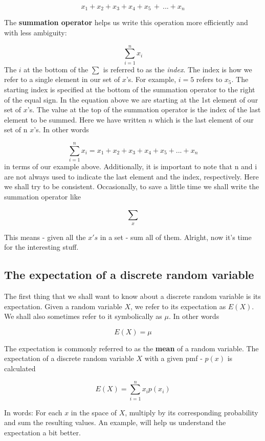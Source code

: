\documentclass[
]{book}
\theoremstyle{definition}
\theoremstyle{definition}
\theoremstyle{definition}
\theoremstyle{definition}
\theoremstyle{remark}
\begin{document}
\[
x_1 + x_2 + x_3 + x_4 + x_5 \,+\:... + x_n
\]

The \textbf{summation operator} helps us write this operation more efficiently and with less ambiguity:

\[
\sum_{i=1}^{n} x_i
\label{eq:summation}
\]
The \(i\) at the bottom of the \(\sum{}^{}\) is referred to as the \emph{index}. The index is how we refer to a single element in our set of \(x\)'s. For example, \(i=5\) refers to \(x_5\). The starting index is specified at the bottom of the summation operator to the right of the equal sign. In the equation above we are starting at the 1st element of our set of \(x\)'s. The value at the top of the summation operator is the index of the last element to be summed. Here we have written \(n\) which is the last element of our set of n \(x\)'s. In other words

\[
\sum_{i=1}^{n} x_i = x_1 + x_2 + x_3 + x_4 + x_5 + ... + x_n
\]
in terms of our example above. Additionally, it is important to note that n and i are not always used to indicate the last element and the index, respectively. Here we shall try to be consistent. Occasionally, to save a little time we shall write the summation operator like

\[
\sum_{x}^{}
\]

This means - given all the \(x's\) in a set - sum all of them. Alright, now it's time for the interesting stuff.

\subsection{The expectation of a discrete random variable}\label{the-expectation-of-a-discrete-random-variable}

The first thing that we shall want to know about a discrete random variable is its expectation. Given a random variable \(X\), we refer to its expectation as \(E(X)\). We shall also sometimes refer to it symbolically as \(\mu\). In other words

\[
E(X) = \mu
\]

The expectation is commonly referred to as the \textbf{mean} of a random variable. The expectation of a discrete random variable \(X\) with a given pmf - \(p(x)\) is calculated

\[
E(X) = \sum_{i = 1}^{n} x_ip(x_i)
\label{eq:discreteexpectation}
\]

In words: For each \(x\) in the space of \(X\), multiply by its corresponding probability and sum the resulting values. An example, will help us understand the expectation a bit better.
\end{document}
